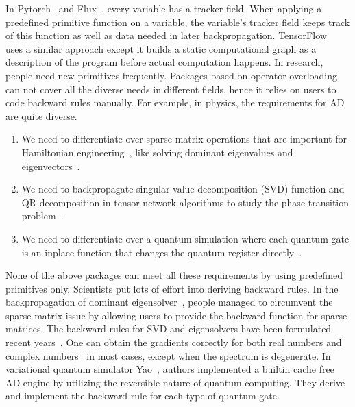 \documentclass[aps,twocolumn,longbibliography,english,superscriptaddress]{revtex4-1}
\newcommand{\<}{\langle}
\renewcommand{\>}{\rangle}
\theoremstyle{definition}\newtheorem{definition}{\textit{Definition}}
\begin{document}
    In Pytorch~\cite{Paszke2017} and Flux~\cite{Innes2018a}, every variable has a tracker field. When applying a predefined primitive function on a variable, the variable's tracker field keeps track of this function as well as data needed in later backpropagation. TensorFlow~\cite{Tensorflow2015} uses a similar approach except it builds a static computational graph as a description of the program before actual computation happens.
    In research, people need new primitives frequently. Packages based on operator overloading can not cover all the diverse needs in different fields,
    hence it relies on users to code backward rules manually.
    For example, in physics, the requirements for AD are quite diverse.
    \begin{enumerate}
        \item We need to differentiate over sparse matrix operations that are important for Hamiltonian engineering~\cite{Xie2020}, like solving dominant eigenvalues and eigenvectors~\cite{Golub2012}.
        \item We need to backpropagate singular value decomposition (SVD) function and QR decomposition in tensor network algorithms to study the phase transition problem~\cite{Golub2012, Liao2019}.
        \item We need to differentiate over a quantum simulation where each quantum gate is an inplace function that changes the quantum register directly~\cite{Luo2019}.
    \end{enumerate}
    None of the above packages can meet all these requirements by using predefined primitives only.
    Scientists put lots of effort into deriving backward rules. In the backpropagation of dominant eigensolver~\cite{Xie2020}, people managed to circumvent the sparse matrix issue by allowing users to provide the backward function for sparse matrices.
    The backward rules for SVD and eigensolvers have been formulated recent years~\cite{Seeger2017,Wan2019,Hubig2019}. One can obtain the gradients correctly for both real numbers and complex numbers~\cite{Wan2019} in most cases, except when the spectrum is degenerate.
    In variational quantum simulator Yao~\cite{Luo2019}, authors implemented a builtin cache free AD engine by utilizing the reversible nature of quantum computing. They derive and implement the backward rule for each type of quantum gate.
\end{document}
